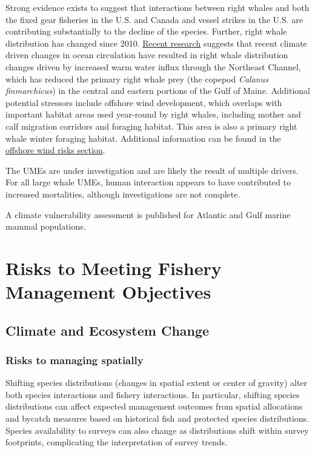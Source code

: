 \documentclass[
  10pt,
]{article}
\begin{document}
Strong evidence exists to suggest that interactions between right whales and both the fixed gear fisheries in the U.S. and Canada and vessel strikes in the U.S. are contributing substantially to the decline of the species. Further, right whale distribution has changed since 2010. \href{https://noaa-edab.github.io/catalog/narw.html}{Recent research} suggests that recent climate driven changes in ocean circulation have resulted in right whale distribution changes driven by increased warm water influx through the Northeast Channel, which has reduced the primary right whale prey (the copepod \emph{Calanus finmarchicus}) in the central and eastern portions of the Gulf of Maine. Additional potential stressors include offshore wind development, which overlaps with important habitat areas used year-round by right whales, including mother and calf migration corridors and foraging habitat. This area is also a primary right whale winter foraging habitat. Additional information can be found in the \hyperref[other-ocean-uses-offshore-wind]{offshore wind risks section}.

The UMEs are under investigation and are likely the result of multiple drivers. For all large whale UMEs, human interaction appears to have contributed to increased mortalities, although investigations are not complete.

A climate vulnerability assessment is published for Atlantic and Gulf marine mammal populations.

\section{Risks to Meeting Fishery Management Objectives}\label{risks-to-meeting-fishery-management-objectives}

\subsection{Climate and Ecosystem Change}\label{climate-and-ecosystem-change}

\subsubsection{Risks to managing spatially}\label{risks-to-managing-spatially}

Shifting species distributions (changes in spatial extent or center of gravity) alter both species interactions and fishery interactions. In particular, shifting species distributions can affect expected management outcomes from spatial allocations and bycatch measures based on historical fish and protected species distributions. Species availability to surveys can also change as distributions shift within survey footprints, complicating the interpretation of survey trends.
\end{document}
